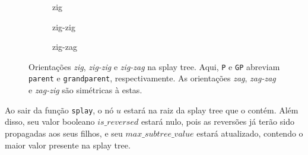 \begin{figure}
    \centering
    \begin{subfigure}[b]{0.3\textwidth}
        \centering
        \caption{zig}
    \end{subfigure}
    \hfill
    \begin{subfigure}[b]{0.3\textwidth}
        \centering
        \caption{zig-zig}
    \end{subfigure}
    \hfill
    \begin{subfigure}[b]{0.3\textwidth}
        \centering
        \caption{zig-zag}
    \end{subfigure}
    \caption{Orientações \textit{zig}, \textit{zig-zig} e \textit{zig-zag} na splay tree. Aqui, \texttt{P} e \texttt{GP} abreviam \texttt{parent} e \texttt{grandparent}, respectivamente. As orientações  \textit{zag}, \textit{zag-zag} e \textit{zag-zig} são simétricas à estas.}
    \label{fig:zig-oris}
\end{figure}


Ao sair da função \texttt{splay}, o nó $u$ estará na raiz da splay tree que o contém. Além disso, seu valor booleano $is\_reversed$ estará nulo, pois as reversões já terão sido propagadas aos seus filhos, e seu $max\_subtree\_value$ estará atualizado, contendo o maior valor presente na splay tree.

